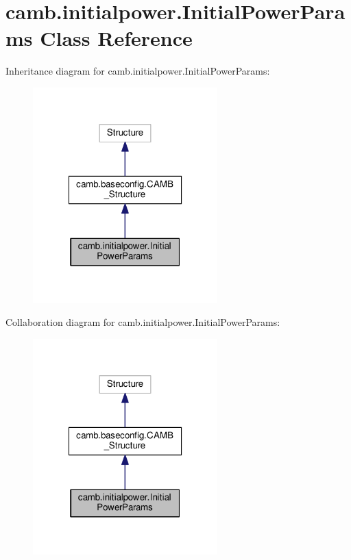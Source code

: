 \hypertarget{classcamb_1_1initialpower_1_1InitialPowerParams}{}\section{camb.\+initialpower.\+Initial\+Power\+Params Class Reference}
\label{classcamb_1_1initialpower_1_1InitialPowerParams}


Inheritance diagram for camb.\+initialpower.\+Initial\+Power\+Params\+:
\nopagebreak
\begin{figure}[H]
\begin{center}
\leavevmode
\includegraphics[width=202pt]{classcamb_1_1initialpower_1_1InitialPowerParams__inherit__graph}
\end{center}
\end{figure}


Collaboration diagram for camb.\+initialpower.\+Initial\+Power\+Params\+:
\nopagebreak
\begin{figure}[H]
\begin{center}
\leavevmode
\includegraphics[width=202pt]{classcamb_1_1initialpower_1_1InitialPowerParams__coll__graph}
\end{center}
\end{figure}
